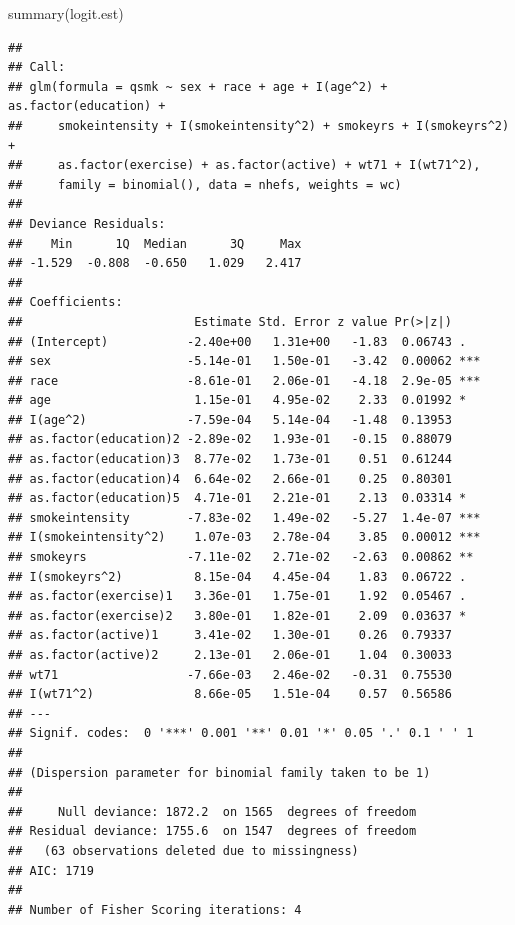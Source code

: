 \documentclass[
  10pt,
]{book}
\newenvironment{Shaded}{\begin{snugshade}}{\end{snugshade}}
\newcommand{\FunctionTok}[1]{\textcolor[rgb]{0.00,0.00,0.00}{#1}}
\newcommand{\NormalTok}[1]{#1}
\begin{document}
\begin{Shaded}
\begin{Highlighting}[]
\FunctionTok{summary}\NormalTok{(logit.est)}
\end{Highlighting}
\end{Shaded}

\begin{verbatim}
## 
## Call:
## glm(formula = qsmk ~ sex + race + age + I(age^2) + as.factor(education) + 
##     smokeintensity + I(smokeintensity^2) + smokeyrs + I(smokeyrs^2) + 
##     as.factor(exercise) + as.factor(active) + wt71 + I(wt71^2), 
##     family = binomial(), data = nhefs, weights = wc)
## 
## Deviance Residuals: 
##    Min      1Q  Median      3Q     Max  
## -1.529  -0.808  -0.650   1.029   2.417  
## 
## Coefficients:
##                        Estimate Std. Error z value Pr(>|z|)    
## (Intercept)           -2.40e+00   1.31e+00   -1.83  0.06743 .  
## sex                   -5.14e-01   1.50e-01   -3.42  0.00062 ***
## race                  -8.61e-01   2.06e-01   -4.18  2.9e-05 ***
## age                    1.15e-01   4.95e-02    2.33  0.01992 *  
## I(age^2)              -7.59e-04   5.14e-04   -1.48  0.13953    
## as.factor(education)2 -2.89e-02   1.93e-01   -0.15  0.88079    
## as.factor(education)3  8.77e-02   1.73e-01    0.51  0.61244    
## as.factor(education)4  6.64e-02   2.66e-01    0.25  0.80301    
## as.factor(education)5  4.71e-01   2.21e-01    2.13  0.03314 *  
## smokeintensity        -7.83e-02   1.49e-02   -5.27  1.4e-07 ***
## I(smokeintensity^2)    1.07e-03   2.78e-04    3.85  0.00012 ***
## smokeyrs              -7.11e-02   2.71e-02   -2.63  0.00862 ** 
## I(smokeyrs^2)          8.15e-04   4.45e-04    1.83  0.06722 .  
## as.factor(exercise)1   3.36e-01   1.75e-01    1.92  0.05467 .  
## as.factor(exercise)2   3.80e-01   1.82e-01    2.09  0.03637 *  
## as.factor(active)1     3.41e-02   1.30e-01    0.26  0.79337    
## as.factor(active)2     2.13e-01   2.06e-01    1.04  0.30033    
## wt71                  -7.66e-03   2.46e-02   -0.31  0.75530    
## I(wt71^2)              8.66e-05   1.51e-04    0.57  0.56586    
## ---
## Signif. codes:  0 '***' 0.001 '**' 0.01 '*' 0.05 '.' 0.1 ' ' 1
## 
## (Dispersion parameter for binomial family taken to be 1)
## 
##     Null deviance: 1872.2  on 1565  degrees of freedom
## Residual deviance: 1755.6  on 1547  degrees of freedom
##   (63 observations deleted due to missingness)
## AIC: 1719
## 
## Number of Fisher Scoring iterations: 4
\end{verbatim}
\end{document}
